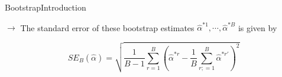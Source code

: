\begin{frame}{Bootstrap}{Introduction}


    
        $\rightarrow$ The standard error of these bootstrap estimates $\hat{\alpha}^{\ast 1}, \cdots , \hat{\alpha}^{\ast B}$ is given by 

        \begin{equation}
            SE_B (\hat{\alpha}) = \sqrt{ \frac{1}{B-1}  \sum_{r=1}^B \left( \hat{\alpha}^{\ast r} - \frac{1}{B}  \sum_{r;=1}^B  \hat{\alpha}^{\ast r'}  \right)^2  }
        \end{equation}


    
\end{frame}
